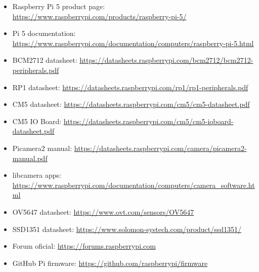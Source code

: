 \documentclass[11pt,a4paper,oneside]{report}
\begin{document}
\begin{itemize}[leftmargin=2em]
  \item Raspberry Pi 5 product page: \url{https://www.raspberrypi.com/products/raspberry-pi-5/}
  \item Pi 5 documentation: \url{https://www.raspberrypi.com/documentation/computers/raspberry-pi-5.html}
  \item BCM2712 datasheet: \url{https://datasheets.raspberrypi.com/bcm2712/bcm2712-peripherals.pdf}
  \item RP1 datasheet: \url{https://datasheets.raspberrypi.com/rp1/rp1-peripherals.pdf}
  \item CM5 datasheet: \url{https://datasheets.raspberrypi.com/cm5/cm5-datasheet.pdf}
  \item CM5 IO Board: \url{https://datasheets.raspberrypi.com/cm5/cm5-ioboard-datasheet.pdf}
  \item Picamera2 manual: \url{https://datasheets.raspberrypi.com/camera/picamera2-manual.pdf}
  \item libcamera apps: \url{https://www.raspberrypi.com/documentation/computers/camera_software.html}
  \item OV5647 datasheet: \url{https://www.ovt.com/sensors/OV5647}
  \item SSD1351 datasheet: \url{https://www.solomon-systech.com/product/ssd1351/}
  \item Forum oficial: \url{https://forums.raspberrypi.com}
  \item GitHub Pi firmware: \url{https://github.com/raspberrypi/firmware}
\end{itemize}
\end{document}
